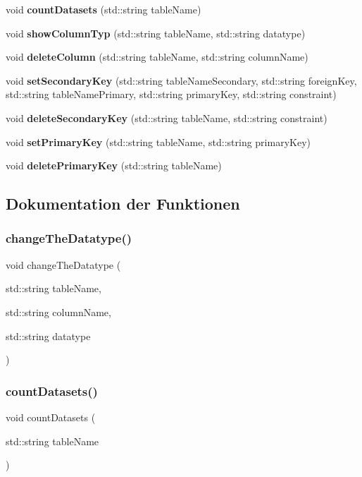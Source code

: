 \begin{DoxyCompactItemize}
\item 
void \textbf{ count\+Datasets} (std\+::string table\+Name)
\item 
void \textbf{ show\+Column\+Typ} (std\+::string table\+Name, std\+::string datatype)
\item 
void \textbf{ delete\+Column} (std\+::string table\+Name, std\+::string column\+Name)
\item 
void \textbf{ set\+Secondary\+Key} (std\+::string table\+Name\+Secondary, std\+::string foreign\+Key, std\+::string table\+Name\+Primary, std\+::string primary\+Key, std\+::string constraint)
\item 
void \textbf{ delete\+Secondary\+Key} (std\+::string table\+Name, std\+::string constraint)
\item 
void \textbf{ set\+Primary\+Key} (std\+::string table\+Name, std\+::string primary\+Key)
\item 
void \textbf{ delete\+Primary\+Key} (std\+::string table\+Name)
\end{DoxyCompactItemize}


\subsection{Dokumentation der Funktionen}
\mbox{\label{tables_8hpp_aef4d6b8ba9c38e5f1b459694421ad9e5}} 
\subsubsection{change\+The\+Datatype()}
{\footnotesize\ttfamily void change\+The\+Datatype (\begin{DoxyParamCaption}\item[{std\+::string}]{table\+Name,  }\item[{std\+::string}]{column\+Name,  }\item[{std\+::string}]{datatype }\end{DoxyParamCaption})}

\mbox{\label{tables_8hpp_ad2178bf4577d7eea6caebd8d1c942088}} 
\subsubsection{count\+Datasets()}
{\footnotesize\ttfamily void count\+Datasets (\begin{DoxyParamCaption}\item[{std\+::string}]{table\+Name }\end{DoxyParamCaption})}

